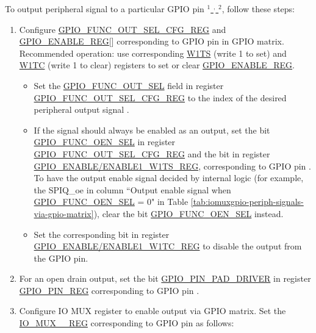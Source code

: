 \documentclass[main\_\_EN.tex]{subfiles}
\begin{document}
To output peripheral signal  to a particular GPIO pin \hyperref[output-note-1]{$^1$ $^,$ $^2$}, follow these steps:

\begin{enumerate}
    \item Configure \hyperref[regdesc:GPIOFUNCNOUTSELCFGREG]{GPIO\_FUNC\_OUT\_SEL\_CFG\_REG} and \hyperref[regdesc:GPIOENABLEREG]{GPIO\_ENABLE\_REG}[] corresponding to GPIO pin  in GPIO matrix. Recommended operation: use corresponding \hyperref[regdesc:GPIOENABLEW1TSREG]{W1TS} (write 1 to set) and \hyperref[regdesc:GPIOENABLEW1TCREG]{W1TC} (write 1 to clear) registers to set or clear \hyperref[regdesc:GPIOENABLEREG]{GPIO\_ENABLE\_REG}.
    \begin{itemize}
        \item Set the \hyperref[fielddesc:GPIOFUNCNOUTSEL]{GPIO\_FUNC\_OUT\_SEL} field in register \hyperref[regdesc:GPIOFUNCNOUTSELCFGREG]{GPIO\_FUNC\_OUT\_SEL\_CFG\_REG} to the index of the desired peripheral output signal .
        \item If the signal should always be enabled as an output, set the bit \hyperref[fielddesc:GPIOFUNCNOENSEL]{GPIO\_FUNC\_OEN\_SEL} in register \hyperref[regdesc:GPIOFUNCNOUTSELCFGREG]{GPIO\_FUNC\_OUT\_SEL\_CFG\_REG} and the bit in register \hyperref[regdesc:GPIOENABLEW1TSREG]{GPIO\_ENABLE/ENABLE1\_W1TS\_REG}, corresponding to GPIO pin . To have the output enable signal decided by internal logic (for example, the SPIQ\_oe in column ``Output enable signal when \hyperref[fielddesc:GPIOFUNCNOENSEL]{GPIO\_FUNC\_OEN\_SEL} = 0" in Table \ref{tab:iomuxgpio-periph-signals-via-gpio-matrix}), clear the bit \hyperref[fielddesc:GPIOFUNCNOENSEL]{GPIO\_FUNC\_OEN\_SEL} instead.
       \item Set the corresponding bit in register \hyperref[regdesc:GPIOENABLEW1TCREG]{GPIO\_ENABLE/ENABLE1\_W1TC\_REG} to disable the output from the GPIO pin.
    \end{itemize}
    \item For an open drain output, set the bit \hyperref[fielddesc:GPIOPINNPADDRIVER]{GPIO\_PIN\_PAD\_DRIVER} in register \hyperref[regdesc:GPIOPINNREG]{GPIO\_PIN\_REG} corresponding to GPIO pin .
    \item Configure IO MUX register to enable output via GPIO matrix. Set the \hyperref[regdesc:IOMUXnREG]{IO\_MUX\_\_REG} corresponding to GPIO pin  as follows:

\end{enumerate}
\end{document}
